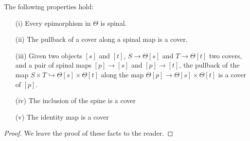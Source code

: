 \begin{prop}\label{covprops} The following properties hold:
\begin{enumerate}
\item [(i)] Every epimorphism in \(\Theta\) is spinal.
\item [(ii)] The pullback of a cover along a spinal map is a cover.
\item [(iii)] Given two objects \([s]\) and \([t]\), \(S\to \Theta[s]\) and \(T\to \Theta[t]\) two covers, and a pair of spinal maps \([p]\to [s]\) and \([p]\to [t]\), the pullback of the map \(S\times T \hookrightarrow \Theta[s]\times \Theta[t]\) along the map \(\Theta[p]\to \Theta[s]\times\Theta[t]\) is a cover of \([p]\).  
\item [(iv)] The inclusion of the spine is a cover
\item [(v)] The identity map is a cover 
\end{enumerate} 
\end{prop}
\begin{proof}
We leave the proof of these facts to the reader.  
\end{proof}
